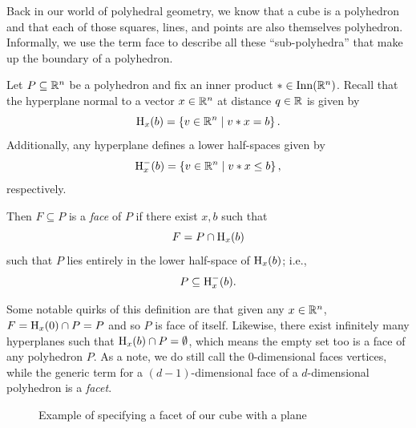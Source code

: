 \documentclass[12pt,oneside]{../../sfsuthesis}
\begin{document}
Back in our world of polyhedral geometry, we know that a cube is a polyhedron and that each of those squares, lines, and points are also themselves polyhedron.
Informally, we use the term face to describe all these ``sub-polyhedra'' that make up the boundary of a polyhedron.
\begin{definition}[Face]\th\label{def:face}
    Let \( P \subseteq \mathbb{R}^n \) be a polyhedron and fix an inner product \( \ast \in \operatorname{Inn}(\mathbb{R}^n) \).
    Recall that the hyperplane normal to a vector \( x \in \mathbb{R}^n \) at distance \( q \in \mathbb{R} \)  is given by
    \[
        \operatorname{H}_x(b) = \left\{ v \in \mathbb{R}^n \; \middle| \; v \ast x = b \right\}.
    \]
    Additionally, any hyperplane defines a lower half-spaces given by
    \[
        \operatorname{H}^{-}_x(b) = \left\{ v \in \mathbb{R}^n \; \middle| \; v \ast x \leq b \right\},
    \]
    respectively.

    Then \( F \subseteq P \) is a \emph{face} of \( P \) if there exist \( x, b \) such that
    \[
        F = P \cap \operatorname{H}_x(b)
    \]
    such that \( P \) lies entirely in the lower half-space of \( \operatorname{H}_x(b) \); i.e.,
    \begin{gather*}
        P \subseteq \operatorname{H}^{-}_x(b).
    \end{gather*}

\end{definition}
Some notable quirks of this definition are that given any \( x \in \mathbb{R}^n \), \( F = \operatorname{H}_x(0) \cap P = P \) and so \( P \) is face of itself.
Likewise, there exist infinitely many hyperplanes such that \( \operatorname{H}_x(b) \cap P = \emptyset \), which means the empty set too is a face of any polyhedron \( P \).
As a note, we do still call the \( 0 \)-dimensional faces vertices, while the generic term for a \( (d - 1) \)-dimensional face of a \( d \)-dimensional polyhedron is a \textit{facet}.
\begin{figure}[H]
    \centering
    \caption{Example of specifying a facet of our cube with a plane}
\end{figure}
\end{document}
